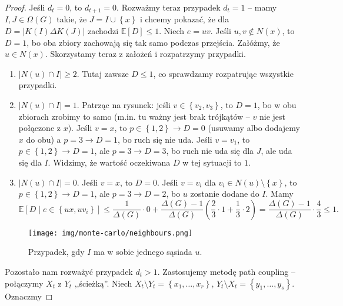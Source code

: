 \begin{proof}
    Jeśli \(d_t = 0\), to \(d_{t+1}=0\). Rozważmy teraz przypadek \(d_t = 1\) -- mamy \(I,J \in \Omega\left( G  \right) \) takie, że \(J = I \cup \left\{ x  \right\} \) i chcemy pokazać, że dla \(D = \left|K\left( I  \right) \Delta K\left( J \right) \right|\) zachodzi \(\mathbb{E}\left[ D  \right] \le 1\). Niech \(e = uv\). Jeśli \(u,v \notin N\left( x  \right) \), to \(D = 1\), bo oba zbiory zachowają się tak samo podczas przejścia. Załóżmy, że \(u \in N\left( x  \right) \). Skorzystamy teraz z założeń i rozpatrzymy przypadki.
    \begin{enumerate}
        \item \(\left|N\left( u  \right) \cap I \right|\ge 2\). Tutaj zawsze \(D \le 1\), co sprawdzamy rozpatrując wszystkie przypadki.
        \item \(\left|N\left( u  \right) \cap I \right|= 1\). Patrząc na rysunek: jeśli \(v \in \left\{ v_2,v_3 \right\} \), to \(D = 1\), bo w obu zbiorach zrobimy to samo (m.in. tu ważny jest brak trójkątów -- \(v\) nie jest połączone z \(x\)). Jeśli \(v = x \), to \(p \in \left\{ 1,2 \right\}  \to  D=0\) (usuwamy albo dodajemy \(x\) do obu) a \(p = 3 \to D = 1\), bo ruch się nie uda. Jeśli \(v = v_1\), to \(p \in \left\{ 1,2 \right\} \to D=1\), ale \(p=3 \to D=3\), bo ruch nie uda się dla \(J\), ale uda się dla \(I\). Widzimy, że wartość oczekiwana  \(D\) w tej sytuacji to \(1\).
        \item \(\left|N\left( u  \right) \cap I \right|=0\). Jeśli \(v=x\), to \(D=0\). Jeśli \(v = v_i\) dla \(v_i \in N\left( u  \right) \setminus \left\{ x \right\} \), to \(p \in \left\{ 1,2 \right\} \to D=1\), ale \(p=3 \to D=2\), bo \(u\) zostanie dodane do \(I\). Mamy 
    \[\mathbb{E}\left[ D \mid e \in \left\{ ux, uv_i \right\}  \right] \le \frac{1}{\Delta\left( G  \right) }\cdot 0 + \frac{\Delta\left( G  \right) -1}{\Delta\left( G  \right) }\left( \frac{2}{3}\cdot 1 + \frac{1}{3}\cdot 2 \right) = \frac{\Delta\left( G  \right) -1}{\Delta\left( G  \right) }\cdot \frac{4}{3}\le 1.\]
    \end{enumerate}
\begin{figure}[H]
    \centering
    \texttt{[image: img/monte-carlo/neighbours.png]}
    \caption{Przypadek, gdy \(I\) ma w sobie jednego sąsiada \(u\).}
    \label{fig:path-coupling}
\end{figure}
    Pozostało nam rozważyć przypadek \(d_t > 1\). Zastosujemy metodę path coupling -- połączymy \(X_t\) z \(Y_t\) ,,ścieżką''. Niech \(X_t \setminus Y_t = \left\{ x_1,\ldots,x_r \right\} \), \(Y_t \setminus X_t = \left\{ y_1,\ldots,y_s \right\} \). Oznaczmy 

\end{proof}
